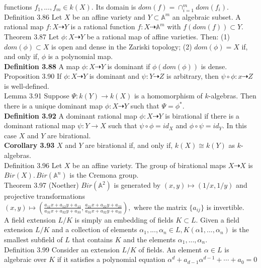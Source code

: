 \documentclass[8pt]{extarticle}
\begin{document}
functions $f_1,...,f_m \in k(X).$ Its domain is $dom(f) = \cap_{i=1}^m dom(f_i).$\\
Definition 3.86 Let $X$ be an affine variety and $Y \subset \mathbb{A}^m$ an algebraic subset. A rational map $f : X \dashrightarrow Y$
is a rational function $f : X \dashrightarrow \mathbb{A}^m$ with $f(dom(f)) \subset Y.$\\
Theorem 3.87 Let $\phi:X\dashrightarrow Y$ be a rational map of affine varieties. Then:
(1) $dom(\phi) \subset X$ is open and dense in the Zariski topology;
(2) $dom(\phi) = X$ if, and only if, $\phi$ is a polynomial map.\\
\textbf{Definition 3.88} A map $\phi: X \dashrightarrow Y$ is dominant if $\phi(dom(\phi))$ is dense.\\
Proposition 3.90 If $\phi: X \dashrightarrow Y$ is dominant and $\psi: Y \dashrightarrow Z$ is arbitrary, then $\psi \circ \phi:x\dashrightarrow Z$ is well-defined.\\
Lemma 3.91 Suppose $\Psi: k(Y ) \rightarrow k(X)$ is a homomorphism of $k$-algebras. Then there is a unique dominant
map $\phi:X\dashrightarrow Y$ such that $\Psi=\phi^*.$\\
\textbf{Definition 3.92} A dominant rational map $\phi:X\dashrightarrow Y$ is birational if there is a dominant rational map $\psi:Y\rightarrow X$ such that $\psi\circ\phi=id_X$ and $\phi\circ\psi=id_Y.$ In this case $X$ and $Y$ are birational.\\
\textbf{Corollary 3.93} $X$ and $Y$ are birational if, and only if, $k(X) \cong k(Y)$ as $k$-algebras.\\
Definition 3.96 Let $X$ be an affine variety. The group of birational maps $X \dashrightarrow X$ is $Bir(X).\, Bir(\mathbb{A}^n)$ is the Cremona group.\\
Theorem 3.97 (Noether) $Bir(\mathbb{A}^2)$ is generated by $(x,y) \mapsto (1/x, 1/y)$ and projective transformations\\
$(x,y)\mapsto (\frac{a_{11}x+a_{12}y+a_{13}}{a_{31}x+a_{32}y+a_{33}},\frac{a_{21}x+a_{22}y+a_{23}}{a_{31}x+a_{32}y+a_{33}}),$ where the matrix $\{a_{ij}\}$ is invertible.\\
A field extension $L/K$ is simply an embedding of fields $K \subset L.$ Given a field extension $L/K$ and a collection of elements $\alpha_1,..., \alpha_n \in L, K(\alpha1,..., \alpha_n)$ is the smallest subfield of $L$ that contains $K$ and the elements $\alpha_1,...,\alpha_n.$\\
Definition 3.99 Consider an extension $L/K$ of fields. An element $\alpha \in L$ is algebraic over $K$ if it satisfies a polynomial equation $\alpha^d+a_{d-1}\alpha^{d-1}+\cdots+a_0=0$
\end{document}
